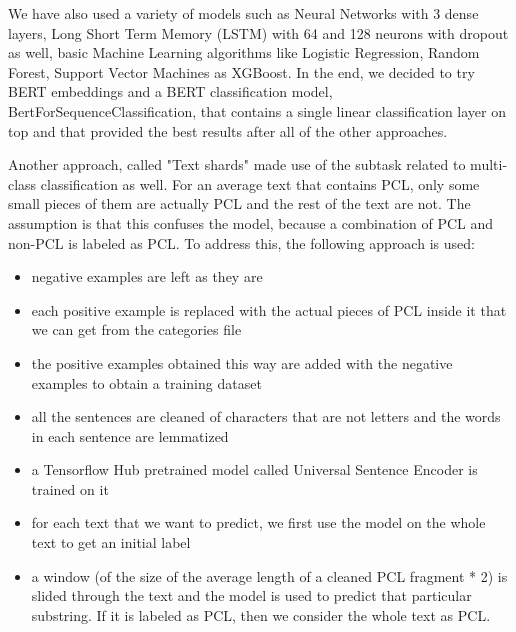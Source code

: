 \documentclass[11pt]{article}
\begin{document}
\begin{enumerate}
	      We have also used a variety of models such as Neural Networks with 3 dense layers, Long Short
	      Term Memory (LSTM) \cite{hichreichter} with 64 and 128 neurons with dropout as well, basic
	      Machine Learning algorithms like Logistic Regression, Random Forest, Support
	      Vector Machines as XGBoost. In the end, we decided to try BERT embeddings
	      and a BERT classification model, BertForSequenceClassification, that
	      contains a single linear classification layer on top and that provided the
	      best results after all of the other approaches.

	      Another approach, called "Text shards" made use of the subtask related to
	      multi-class classification as well. For an average text that contains PCL,
	      only some small pieces of them are actually PCL and the rest of the text are
	      not. The assumption is that this confuses the model, because a combination
	      of PCL and non-PCL is labeled as PCL. To address this, the following
	      approach is used:

	      \begin{itemize}
		      \item negative examples are left as they are

		      \item each positive example is replaced with the actual pieces of PCL inside
		            it that we can get from the categories file

		      \item the positive examples obtained this way are added with the negative
		            examples to obtain a training dataset

		      \item all the sentences are cleaned of characters that are not letters and
		            the words in each sentence are lemmatized

		      \item a Tensorflow Hub pretrained model called Universal Sentence Encoder is
		            trained on it

		      \item for each text that we want to predict, we first use the model on the
		            whole text to get an initial label

		      \item a window (of the size of the average length of a cleaned PCL fragment
		            * 2) is slided through the text and the model is used to predict that
		            particular substring. If it is labeled as PCL, then we consider the whole
		            text as PCL.
	      \end{itemize}


\end{enumerate}
\end{document}
